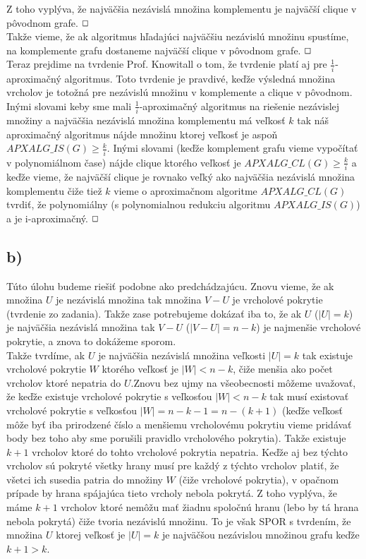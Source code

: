 \documentclass[a4paper]{article}
\begin{document}
Z toho vyplýva, že najväčšia nezávislá množina komplementu je najväčší clique v pôvodnom grafe. $\oblong$
\\

Takže vieme, že ak algoritmus hľadajúci najväčšiu nezávislú množinu spustíme, na komplemente grafu dostaneme najväčší clique v pôvodnom grafe. $\oblong$
\\

Teraz prejdime na tvrdenie Prof. Knowitall o tom, že tvrdenie platí aj pre $\frac{1}{i}$-aproximačný algoritmus. Toto tvrdenie je pravdivé, keďže výsledná množina vrcholov je totožná pre nezávislú množinu v komplemente a clique v pôvodnom. Inými slovami keby sme mali $\frac{1}{i}$-aproximačný algoritmus na riešenie nezávislej množiny a najväčšia nezávislá množina komplementu má veľkosť $k$ tak náš aproximačný algoritmus nájde množinu ktorej veľkosť je aspoň $APXALG\_IS(G)\geq\frac{k}{i}$. Inými slovami (keďže komplement grafu vieme vypočítať v polynomiálnom čase) nájde clique ktorého veľkosť je $APXALG\_CL(G)\geq\frac{k}{i}$ a keďže vieme, že najväčší clique je rovnako veľký ako najväčšia nezávislá množina komplementu čiže tiež $k$ vieme o aproximačnom algoritme $APXALG\_CL(G)$ tvrdiť, že polynomiálny (s polynomialnou redukciu algoritmu $APXALG\_IS(G)$) a je i-aproximačný. $\oblong$
\newpage

\subsection*{b)}

Túto úlohu budeme riešiť podobne ako predchádzajúcu. Znovu vieme, že ak množina $U$ je nezávislá množina tak množina $V-U$ je vrcholové pokrytie (tvrdenie zo zadania). Takže zase potrebujeme dokázať iba to, že ak $U$ ($|U|=k$) je najväčšia nezávislá množina tak $V-U$ ($|V-U|=n-k$) je najmenšie vrcholové pokrytie, a znova to dokážeme sporom.
\\

Takže tvrdíme, ak $U$ je najväčšia nezávislá množina veľkosti $|U|=k$ tak existuje vrcholové pokrytie $W$ ktorého veľkosť je $|W|<n-k$, čiže menšia ako počet vrcholov ktoré nepatria do $U$.Znovu bez ujmy na všeobecnosti môžeme uvažovať, že keďže existuje vrcholové pokrytie s veľkosťou $|W|<n-k$ tak musí existovať vrcholové pokrytie s veľkosťou $|W|=n-k-1=n-(k+1)$ (keďže veľkosť môže byť iba prirodzené číslo a menšiemu vrcholovému pokrytiu vieme pridávať body bez toho aby sme porušili pravidlo vrcholového pokrytia). Takže existuje $k+1$ vrcholov ktoré do tohto vrcholové pokrytia nepatria. Keďže aj bez týchto vrcholov sú pokryté všetky hrany musí pre každý z týchto vrcholov platiť, že všetci ich susedia patria do množiny $W$ (čiže vrcholové pokrytia), v opačnom prípade by hrana spájajúca tieto vrcholy nebola pokrytá. Z toho vyplýva, že máme $k+1$ vrcholov ktoré nemôžu mať žiadnu spoločnú hranu (lebo by tá hrana nebola pokrytá) čiže tvoria nezávislú množinu. To je však SPOR s tvrdením, že množina $U$ ktorej veľkosť je $|U|=k$ je najväčšou nezávislou množinou grafu keďže $k+1>k$.
\end{document}
